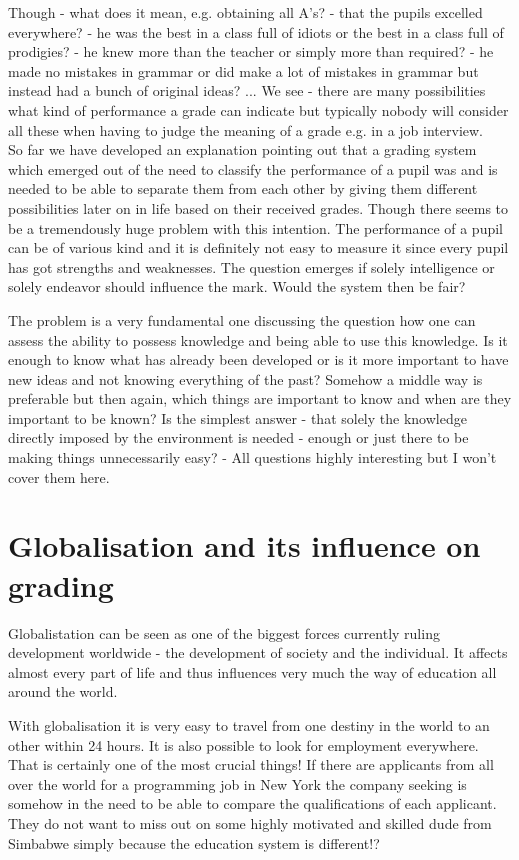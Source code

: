 \documentclass[12pt,a4paper]{article}
\begin{document}
  Though - what does it mean, e.g. obtaining all A's? - that the pupils excelled everywhere? - he was the best in a class full of idiots or the best in a class full of prodigies? - he knew more than the teacher or simply more than required? - he made no mistakes in grammar or did make a lot of mistakes in grammar but instead had a bunch of original ideas? ... We see - there are many possibilities what kind of performance a grade can indicate but typically nobody will consider all these when having to judge the meaning of a grade e.g. in a job interview. \\
  
  So far we have developed an explanation pointing out that a grading system which emerged out of the need to classify the performance of a pupil was and is needed to be able to separate them from each other by giving them different possibilities later on in life based on their received grades. Though there seems to be a tremendously huge problem with this intention. The performance of a pupil can be of various kind and it is definitely not easy to measure it since every pupil has got strengths and weaknesses. The question emerges if solely intelligence or solely endeavor should influence the mark. Would the system then be fair?
  
  The problem is a very fundamental one discussing the question how one can assess the ability to possess knowledge and being able to use this knowledge. Is it enough to know what has already been developed or is it more important to have new ideas and not knowing everything of the past? Somehow a middle way is preferable but then again, which things are important to know and when are they important to be known? Is the simplest answer - that solely the knowledge directly imposed by the environment is needed - enough or just there to be making things unnecessarily easy? - All questions highly interesting but I won't cover them here.\\
  
  \section{Globalisation and its influence on grading}
  Globalistation can be seen as one of the biggest forces currently ruling development worldwide - the development of society and the individual. It affects almost every part of life and thus influences very much the way of education all around the world. 
  
  With globalisation it is very easy to travel from one destiny in the world to an other within 24 hours. It is also possible to look for employment everywhere. That is certainly one of the most crucial things! If there are applicants from all over the world for a programming job in New York the company seeking is somehow in the need to be able to compare the qualifications of each applicant. They do not want to miss out on some highly motivated and skilled dude from Simbabwe simply because the education system is different!? 
  
\end{document}

